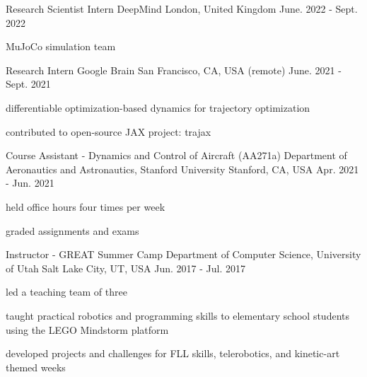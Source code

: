 

\begin{cventries}
	
\cventry
{Research Scientist Intern} %
{DeepMind} %
{London, United Kingdom} %
{June. 2022 - Sept. 2022} %
{
	\begin{cvitems} %
		\item{MuJoCo simulation team}
	\end{cvitems}
}

\cventry
{Research Intern} %
{Google Brain} %
{San Francisco, CA, USA (remote)} %
{June. 2021 - Sept. 2021} %
{
	\begin{cvitems} %
		\item{differentiable optimization-based dynamics for trajectory optimization}
		\item{contributed to open-source JAX project: trajax}
	\end{cvitems}
}
	
\cventry
{Course Assistant - Dynamics and Control of Aircraft (AA271a)} %
{Department of Aeronautics and Astronautics, Stanford University} %
{Stanford, CA, USA} %
{Apr. 2021 - Jun. 2021} %
{
	\begin{cvitems} %
		\item{held office hours four times per week}
		\item{graded assignments and exams}
	\end{cvitems}
}

  \cventry
    {Instructor - GREAT Summer Camp} %
    {Department of Computer Science, University of Utah} %
    {Salt Lake City, UT, USA} %
    {Jun. 2017 - Jul. 2017} %
    {
      \begin{cvitems} %
        \item {led a teaching team of three}
        \item{taught practical robotics and programming skills to elementary school students using the LEGO Mindstorm platform}
        \item {developed projects and challenges for FLL skills, telerobotics, and kinetic-art themed weeks}
      \end{cvitems}
    }


\end{cventries}
